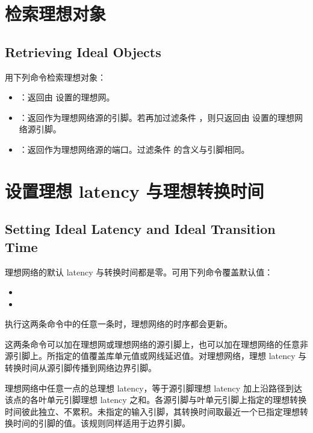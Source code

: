 \section{检索理想对象}
\subsection*{Retrieving Ideal Objects}

用下列命令检索理想对象：
\begin{itemize}
  \item {}：返回由  设置的理想网。
  \item {}：返回作为理想网络源的引脚。若再加过滤条件 ，则只返回由  设置的理想网络源引脚。
  \item {}：返回作为理想网络源的端口。过滤条件  的含义与引脚相同。
\end{itemize}

\section{设置理想 latency 与理想转换时间}
\subsection*{Setting Ideal Latency and Ideal Transition Time}

理想网络的默认 latency 与转换时间都是零。可用下列命令覆盖默认值：
\begin{itemize}
  \item {}
  \item {}
\end{itemize}

\begin{noteBox}
执行这两条命令中的任意一条时，理想网络的时序都会更新。
\end{noteBox}

这两条命令可以加在理想网或理想网络的源引脚上，也可以加在理想网络的任意非源引脚上。所指定的值覆盖库单元值或网线延迟值。对理想网络，理想 latency 与转换时间从源引脚传播到网络边界引脚。

理想网络中任意一点的总理想 latency，等于源引脚理想 latency 加上沿路径到达该点的各叶单元引脚理想 latency 之和。各源引脚与叶单元引脚上指定的理想转换时间彼此独立、不累积。未指定的输入引脚，其转换时间取最近一个已指定理想转换时间的引脚的值。该规则同样适用于边界引脚。

